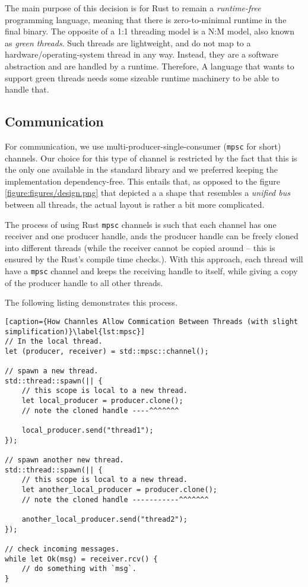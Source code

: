 The main purpose of this decision is for Rust to remain a \textit{runtime-free} programming
language\cite{RustJourneyAsync}, meaning that there is zero-to-minimal runtime in the final binary.
The opposite of a 1:1 threading model is a N:M model, also known as \textit{green threads}. Such
threads are lightweight, and do not map to a hardware/operating-system thread in any way. Instead,
they are a software abstraction and are handled by a runtime. Therefore, A language that wants to
support green threads needs some sizeable runtime machinery to be able to handle that.

\subsection{Communication}

For communication, we use multi-producer-single-consumer\cite{StdSyncMpsc} (\texttt{mpsc} for short)
channels. Our choice for this type of channel is restricted by the fact that this is the only one
available in the standard library and we preferred keeping the implementation dependency-free. This
entails that, as opposed to the figure \ref{figure:figures/design.png} that depicted a a shape that
resembles a \textit{unified bus} between all threads, the actual layout is rather a bit more
complicated.

The process of using Rust \texttt{mpsc} channels is such that each channel has one receiver and one
producer handle, ands the producer handle can be freely cloned into different threads (while the
receiver cannot be copied around -- this is ensured by the Rust's compile time checks.). With this
approach, each thread will have a \texttt{mpsc} channel and keeps the receiving handle to itself,
while giving a copy of the producer handle to all other threads.

The following listing demonstrates this process.

\begin{lstlisting}[caption={How Channles Allow Commication Between Threads (with slight simplification)}\label{lst:mpsc}]
// In the local thread.
let (producer, receiver) = std::mpsc::channel();

// spawn a new thread. 
std::thread::spawn(|| {
	// this scope is local to a new thread. 
	let local_producer = producer.clone();
	// note the cloned handle ----^^^^^^^

	local_producer.send("thread1");
});

// spawn another new thread.
std::thread::spawn(|| {
	// this scope is local to a new thread.
	let another_local_producer = producer.clone();
	// note the cloned handle -----------^^^^^^^

	another_local_producer.send("thread2");
});

// check incoming messages.
while let Ok(msg) = receiver.rcv() {
	// do something with `msg`.
}
\end{lstlisting}



